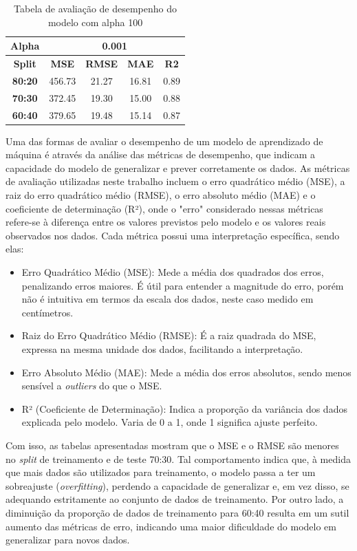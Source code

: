 \begin{table}[H]
\centering
\begin{tabular}{|c|c|c|c|c|}
\hline
\textbf{Alpha} & \multicolumn{4}{|c|}{\textbf{0.001}} \\
\hline
\textbf{Split} & \textbf{MSE} & \textbf{RMSE} & \textbf{MAE} & \textbf{R2} \\
\hline
\textbf{80:20} & 456.73 & 21.27 & 16.81 & 0.89 \\
\textbf{70:30} & 372.45 & 19.30 & 15.00 & 0.88 \\
\textbf{60:40} & 379.65 & 19.48 & 15.14 & 0.87 \\
\hline
\end{tabular}
\caption{Tabela de avaliação de desempenho do modelo com alpha 100}
\label{tab:avaliacao_alpha_100}
\end{table}

Uma das formas de avaliar o desempenho de um modelo de aprendizado de máquina é através da análise das métricas de desempenho, que indicam a capacidade do modelo de generalizar e prever corretamente os dados. As métricas de avaliação utilizadas neste trabalho incluem o erro quadrático médio (MSE), a raiz do erro quadrático médio (RMSE), o erro absoluto médio (MAE) e o coeficiente de determinação (R²), onde o "erro" considerado nessas métricas refere-se à diferença entre os valores previstos pelo modelo e os valores reais observados nos dados. Cada métrica possui uma interpretação específica, sendo elas:

\begin{itemize}
	\item Erro Quadrático Médio (MSE): Mede a média dos quadrados dos erros, penalizando erros maiores. É útil para entender a magnitude do erro, porém não é intuitiva em termos da escala dos dados, neste caso medido em centímetros.
	\item Raiz do Erro Quadrático Médio (RMSE): É a raiz quadrada do MSE, expressa na mesma unidade dos dados, facilitando a interpretação.
	\item Erro Absoluto Médio (MAE): Mede a média dos erros absolutos, sendo menos sensível a \textit{outliers} do que o MSE.
	\item R² (Coeficiente de Determinação): Indica a proporção da variância dos dados explicada pelo modelo. Varia de 0 a 1, onde 1 significa ajuste perfeito.
\end{itemize}

Com isso, as tabelas apresentadas mostram que o MSE e o RMSE são menores no \textit{split} de treinamento e de teste 70:30. Tal comportamento indica que, à medida que mais dados são utilizados para treinamento, o modelo passa a ter um sobreajuste (\textit{overfitting}), perdendo a capacidade de generalizar e, em vez disso, se adequando estritamente ao conjunto de dados de treinamento. Por outro lado, a diminuição da proporção de dados de treinamento para 60:40 resulta em um sutil aumento das métricas de erro, indicando uma maior dificuldade do modelo em generalizar para novos dados.


